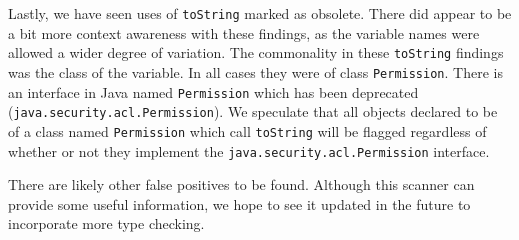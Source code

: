 Lastly, we have seen uses of \texttt{toString} marked as obsolete. There did appear to be a bit more context awareness with these findings, as the variable names were allowed a wider degree of variation. The commonality in these \texttt{toString} findings was the class of the variable. In all cases they were of class \texttt{Permission}. There is an interface in Java named \texttt{Permission} which has been deprecated (\texttt{java.security.acl.Permission}). We speculate that all objects declared to be of a class named \texttt{Permission} which call \texttt{toString} will be flagged regardless of whether or not they implement the \texttt{java.security.acl.Permission} interface.

There are likely other false positives to be found. Although this scanner can provide some useful information, we hope to see it updated in the future to incorporate more type checking.
